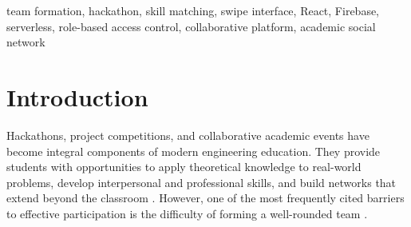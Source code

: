 \documentclass[conference]{IEEEtran}
\begin{document}
\begin{abstract}
Finding compatible teammates for academic hackathons and project-based events is a persistent challenge faced by students in engineering colleges. Traditional methods of team formation rely on personal networks, chance encounters, or informal communication channels --- all of which are inefficient and often lead to skill imbalances within teams. This paper presents \textbf{MITAOE TeamSync}, a full-stack web-based collaborative platform designed specifically for students of MIT Academy of Engineering (MITAOE) to discover and connect with teammates based on skill compatibility. The system incorporates a novel swipe-based matching interface inspired by modern social-recommendation systems, a secure authentication architecture using Firebase Auth with institutional domain restriction, and a real-time communication module using Cloud Firestore. The backend is implemented as a serverless architecture leveraging Firebase Services, while the frontend is built with React 18, Vite, and Tailwind CSS. An administrative dashboard provides faculty and coordinators with full visibility over user activity and event participation. Experimental results and user evaluations demonstrate that TeamSync significantly reduces the time and effort required to form balanced, skill-diverse teams, thereby improving participation quality in technical events.
\end{abstract}

\begin{IEEEkeywords}
team formation, hackathon, skill matching, swipe interface, React, Firebase, serverless, role-based access control, collaborative platform, academic social network
\end{IEEEkeywords}

\section{Introduction}

Hackathons, project competitions, and collaborative academic events have become integral components of modern engineering education. They provide students with opportunities to apply theoretical knowledge to real-world problems, develop interpersonal and professional skills, and build networks that extend beyond the classroom \cite{nandi2016hackathons}. However, one of the most frequently cited barriers to effective participation is the difficulty of forming a well-rounded team \cite{powell2012team}.
\end{document}
